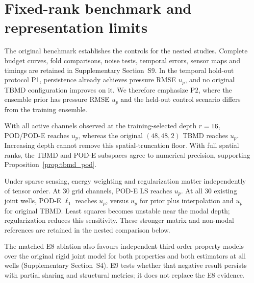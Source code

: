 \section{Fixed-rank benchmark and representation limits}
\label{sec:results}
\label{sec:res_representation}
The original benchmark establishes the controls for the nested studies. Complete budget curves, fold comparisons, noise tests, temporal errors, sensor maps and timings are retained in Supplementary Section~S9. In the temporal hold-out protocol P1, persistence already achieves pressure RMSE \POnePriorGridTenP{} $u_p$, and no original TBMD configuration improves on it. We therefore emphasize P2, where the ensemble prior has pressure RMSE \PTwoPriorGridTenP{} $u_p$ and the held-out control scenario differs from the training ensemble.

With all active channels observed at the training-selected depth $r=16$, POD/POD-E reaches \EOnePTwoPodOracle{} $u_p$, whereas the original $(48,48,2)$ TBMD reaches \EOnePTwoTbmdOracle{} $u_p$. Increasing depth cannot remove this spatial-truncation floor. With full spatial ranks, the TBMD and POD-E subspaces agree to numerical precision, supporting Proposition~\ref{prop:tbmd_pod}.

Under sparse sensing, energy weighting and regularization matter independently of tensor order. At 30 grid channels, POD-E LS reaches \PTwoPodeLsGridThirtyP{} $u_p$. At all 30 existing joint wells, POD-E $\ell_1$ reaches \PTwoPodeLoneWellThirtyP{} $u_p$, versus \PTwoIdwWellThirtyP{} $u_p$ for prior plus interpolation and \PTwoTbmdLoneWellThirtyP{} $u_p$ for original TBMD. Least squares becomes unstable near the modal depth; regularization reduces this sensitivity. These stronger matrix and non-modal references are retained in the nested comparison below.

The matched E8 ablation also favours independent third-order property models over the original rigid joint model for both properties and both estimators at all wells (Supplementary Section~S4). E9 tests whether that negative result persists with partial sharing and structural metrics; it does not replace the E8 evidence.
